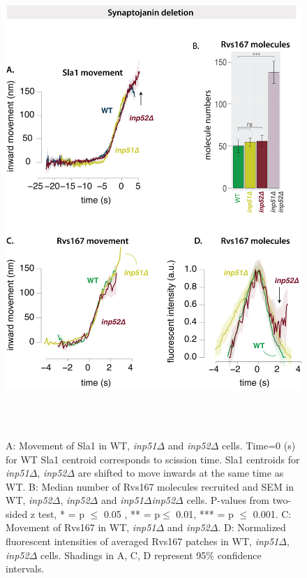 \vspace{3mm}
\begin{figure}[H]
	\centering
	\includegraphics[width=18cm,height=18cm,keepaspectratio]{figures/results_final/inp_movement3}
	\caption[Effect of synaptojanin deletion]
	{A: Movement of Sla1 in WT, \textit{inp51$\Delta$} and \textit{inp52$\Delta$} cells. Time=0 (s) for WT Sla1 centroid corresponds to scission time. Sla1 centroids for \textit{inp51$\Delta$}, \textit{inp52$\Delta$}  are shifted to move inwards at the same time as WT. 
		B: Median number of Rvs167 molecules recruited and SEM in WT, \textit{inp52$\Delta$}, \textit{inp52$\Delta$} and \textit{inp51$\Delta$inp52$\Delta$} cells. P-values from two-sided z test,  * = p $\leq$ 0.05 , ** = p$\leq$ 0.01, *** = p $\leq$ 0.001.  
		C: Movement of Rvs167 in WT, \textit{inp51$\Delta$} and \textit{inp52$\Delta$}. 
		D: Normalized fluorescent intensities of averaged Rvs167 patches in WT, \textit{inp51$\Delta$}, \textit{inp52$\Delta$ } cells. Shadings in A, C, D represent 95\% confidence intervals.
		\label{fig_inpmov}}
\end{figure}

